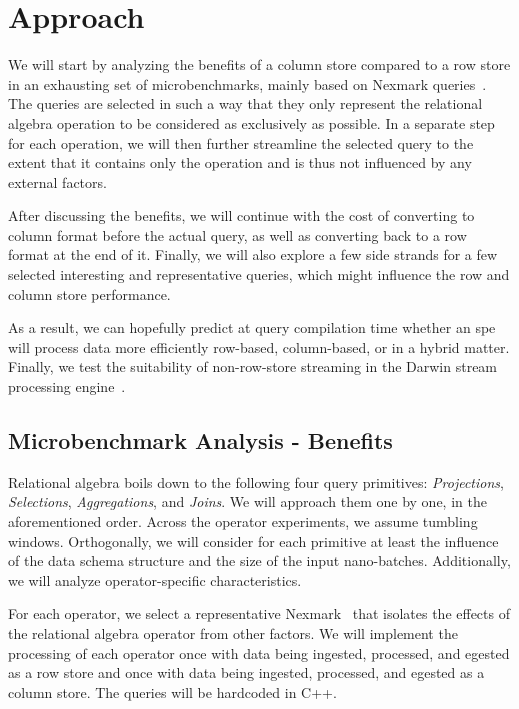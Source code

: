 \section{Approach}
\label{sec:approach}

We will start by analyzing the benefits of a column store compared to a row store in an exhausting set of microbenchmarks, mainly based on Nexmark queries~\cite[]{tucker2008nexmark}.
The queries are selected in such a way that they only represent the relational algebra operation to be considered as exclusively as possible. 
In a separate step for each operation, we will then further streamline the selected query to the extent that it contains only the operation and is thus not influenced by any external factors.

After discussing the benefits, we will continue with the cost of converting to column format before the actual query, as well as converting back to a row format at the end of it.
Finally, we will also explore a few side strands for a few selected interesting and representative queries, which might influence the row and column store performance.

As a  result, we can hopefully predict at query compilation time whether an \ac{spe} will process data more efficiently row-based, column-based, or in a hybrid matter.
Finally, we test the suitability of non-row-store streaming in the Darwin stream processing engine~\cite[]{DBLP:conf/cidr/BensonR22}.

\subsection{Microbenchmark Analysis - Benefits}
Relational algebra boils down to the following four query primitives: \emph{Projections}, \emph{Selections}, \emph{Aggregations}, and \emph{Joins}.
We will approach them one by one, in the aforementioned order.
Across the operator experiments, we assume tumbling windows.
Orthogonally, we will consider for each primitive at least the influence of the data schema structure and the size of the input nano-batches.
Additionally, we will analyze operator-specific characteristics.

For each operator, we select a representative Nexmark~\cite{tucker2008nexmark} that isolates the effects of the relational algebra operator from other factors.
We will implement the processing of each operator once with data being ingested, processed, and egested as a row store and once with data being ingested, processed, and egested as a column store.
The queries will be hardcoded in C++.

